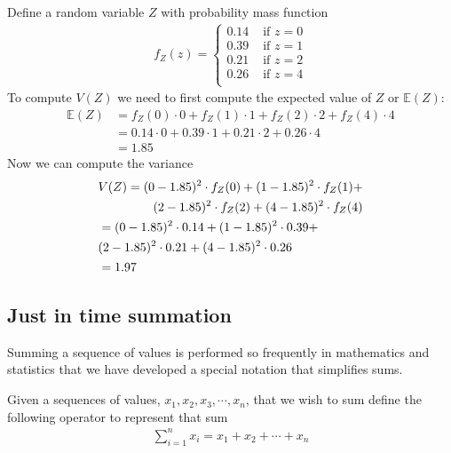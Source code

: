 \ex Define a random variable $Z$ with probability mass function 
\begin{align}
    f_{Z}(z) = \begin{cases}
                  0.14 & \text{ if } z=0\\
                  0.39 & \text{ if } z=1\\
                  0.21 & \text{ if } z=2\\
                  0.26 & \text{ if } z=4\\
               \end{cases}
\end{align}
To compute $V(Z)$ we need to first compute the expected value of $Z$ or $\mathbb{E}(Z)$: 
\begin{align}
    \mathbb{E}(Z) &= f_{Z}(0) \cdot 0 + f_{Z}(1) \cdot 1 + f_{Z}(2) \cdot 2 + f_{Z}(4) \cdot 4\\
                  &= 0.14 \cdot 0 + 0.39 \cdot 1 + 0.21 \cdot 2 + 0.26 \cdot 4\\
                  &= 1.85 
\end{align}
Now we can compute the variance
\begin{align}
    &\begin{aligned}
        V(Z) = (0-1.85)^{2} \cdot f_{Z}(0) + (1-1.85)^{2} \cdot f_{Z}(1) +\\
          (2-1.85)^{2} \cdot f_{Z}(2) + (4-1.85)^{2} \cdot f_{Z}(4)
    \end{aligned}\vspace{3mm}\\ 
    &\begin{aligned}
        &=(0-1.85)^{2} \cdot 0.14 + (1-1.85)^{2} \cdot 0.39 +\\
        &(2-1.85)^{2} \cdot 0.21 + (4-1.85)^{2} \cdot 0.26
    \end{aligned}  \vspace{3mm}\\ 
    &= 1.97
\end{align}


\subsection{Just in time summation}

Summing a sequence of values is performed so frequently in mathematics and statistics that we have developed a special notation that simplifies sums. 

Given a sequences of values, $x_{1}, x_{2}, x_{3}, \cdots, x_{n}$, that we wish to sum define the following operator to represent that sum
\begin{align}
    \sum_{i=1}^{n} x_{i} = x_{1} + x_{2} + \cdots + x_{n}
\end{align}

